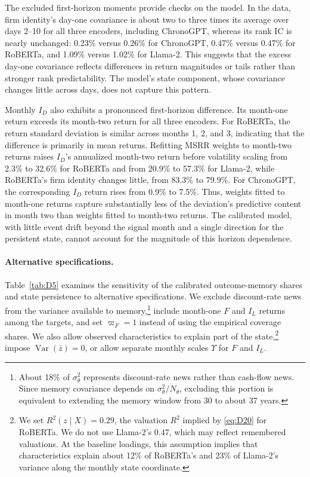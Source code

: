 \documentclass[11pt,letterpaper]{article}
\theoremstyle{remark}
\DeclareMathOperator{\Var}{Var}
\begin{document}
The excluded first-horizon moments provide checks on the model. In the data, firm identity's day-one covariance is about two to three times its average over days 2--10 for all three encoders, including ChronoGPT, whereas its rank IC is nearly unchanged: 0.23\% versus 0.26\% for ChronoGPT, 0.47\% versus 0.47\% for RoBERTa, and 1.09\% versus 1.02\% for Llama-2. This suggests that the excess day-one covariance reflects differences in return magnitudes or tails rather than stronger rank predictability. The model's state component, whose covariance changes little across days, does not capture this pattern.

Monthly $I_D$ also exhibits a pronounced first-horizon difference. Its month-one return exceeds its month-two return for all three encoders. For RoBERTa, the return standard deviation is similar across months 1, 2, and 3, indicating that the difference is primarily in mean returns. Refitting MSRR weights to month-two returns raises $I_D$'s annualized month-two return before volatility scaling from 2.3\% to 32.6\% for RoBERTa and from 20.9\% to 57.3\% for Llama-2, while RoBERTa's firm identity changes little, from 83.3\% to 79.9\%.
For ChronoGPT, the corresponding $I_D$ return rises from 0.9\% to 7.5\%.
Thus, weights fitted to month-one returns capture substantially less of the deviation's predictive content in month two than weights fitted to month-two returns. The calibrated model, with little event drift beyond the signal month and a single direction for the persistent state, cannot account for the magnitude of this horizon dependence.

\paragraph{Alternative specifications.}
Table~\ref{tab:D5} examines the sensitivity of the calibrated outcome-memory shares and state persistence to alternative specifications. We exclude discount-rate news from the variance available to memory,\footnote{About 18\% of $\sigma_\theta^2$ represents discount-rate news rather than cash-flow news. Since memory covariance depends on $\sigma_\theta^2/N_\theta$, excluding this portion is equivalent to extending the memory window from 30 to about 37 years.} include month-one $F$ and $I_L$ returns among the targets, and set $\varpi_F=1$ instead of using the empirical coverage shares. We also allow observed characteristics to explain part of the state,\footnote{We set $R^2(z\mid X)=0.29$, the valuation $R^2$ implied by \eqref{eq:D20} for RoBERTa. We do not use Llama-2's 0.47, which may reflect remembered valuations. At the baseline loadings, this assumption implies that characteristics explain about 12\% of RoBERTa's and 23\% of Llama-2's variance along the monthly state coordinate.} impose $\Var(\bar z)=0$, or allow separate monthly scales $\Upsilon$ for $F$ and $I_L$.
\end{document}
